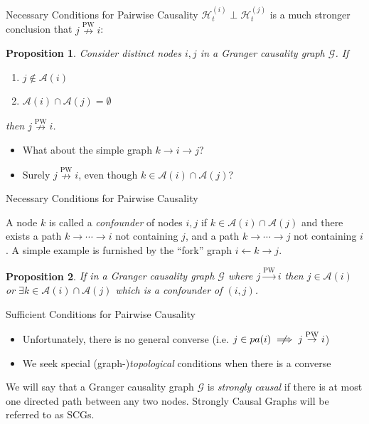 \documentclass{beamer} %
\newtheorem*{proposition}{Proposition}
\def\pwgc{\overset{\text{PW}}{\rightarrow}}  %
\def\npwgc{\overset{\text{PW}}{\nrightarrow}}  %
\def\gcg{\mathcal{G}}  %
\def\H{\mathcal{H}}  %
\newcommand{\pa}[1]{pa(#1)}  %
\newcommand{\anc}[1]{\mathcal{A}(#1)}  %
\newcommand{\gcgpath}[2]{#1 \rightarrow \cdots \rightarrow #2}  %
\begin{document}
\begin{frame}{Necessary Conditions for Pairwise Causality}
  $\H_t^{(i)} \perp \H_t^{(j)}$ is a much stronger conclusion that $j \npwgc i$:
  \begin{proposition}
    Consider distinct nodes $i, j$ in a Granger causality graph $\gcg$.
    If

    \begin{enumerate}
      \item{$j \not\in \anc{i}$}\pause
      \item{$\anc{i}\cap\anc{j} = \emptyset$}\pause
    \end{enumerate}

    then $j \npwgc i$.
  \end{proposition}\pause

  \begin{itemize}
    \item{What about the simple graph $k \rightarrow i \rightarrow j$?}\pause
    \item{Surely $j \npwgc i$, even though $k \in \anc{i} \cap \anc{j}$?}
  \end{itemize}
\end{frame}

\begin{frame}{Necessary Conditions for Pairwise Causality}
  \begin{definition}[Confounder]
    A node $k$ is called a \textit{confounder} of nodes $i, j$ if
    $k \in \anc{i} \cap \anc{j}$ and there exists a path
    $\gcgpath{k}{i}$ not containing $j$, and a path $\gcgpath{k}{j}$
    not containing $i$.  A simple example is furnished by the ``fork''
    graph $i \leftarrow k \rightarrow j$.
  \end{definition}\pause

\begin{proposition}
  \label{prop:ancestor_properties}
  If in a Granger causality graph $\gcg$ where $j \pwgc i$ then
  $j \in \anc{i}$ or $\exists k \in \anc{i} \cap\anc{j}$ which is a
  confounder of $(i, j)$.
\end{proposition}
\end{frame}

\begin{frame}{Sufficient Conditions for Pairwise Causality}
  \begin{itemize}
    \item{Unfortunately, there is no general converse (i.e. $j \in \pa{i} \centernot\implies j \pwgc i$)}\pause
    \item{We seek special (graph-)\textit{topological} conditions when there is a converse}\pause
  \end{itemize}

  \begin{definition}
    \label{def:strongly_causal}
    We will say that a Granger causality graph $\gcg$ is
    \textit{strongly causal} if there is at most one directed path between
    any two nodes.  Strongly Causal Graphs will be referred to as SCGs.
  \end{definition}
\end{frame}
\end{document}
